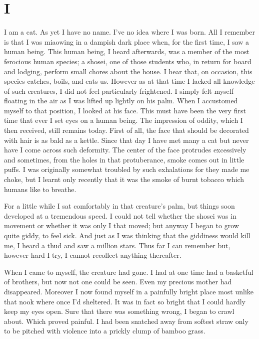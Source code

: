 \documentclass{book}
\begin{document}
\chapter*{\centering I}
I am a cat. As yet I have no name. I've no idea where I was born. All I
remember is that I was miaowing in a dampish dark place when, for the
first time, I saw a human being. This human being, I heard afterwards,
was a member of the most ferocious human species; a shosei, one of those
students who, in return for board and lodging, perform small chores
about the house. I hear that, on occasion, this species catches, boils,
and eats us. However as at that time I lacked all knowledge of such
creatures, I did not feel particularly frightened. I simply felt myself
floating in the air as I was lifted up lightly on his palm. When I
accustomed myself to that position, I looked at his face. This must have
been the very first time that ever I set eyes on a human being. The
impression of oddity, which I then received, still remains today. First
of all, the face that should be decorated with hair is as bald as a
kettle. Since that day I have met many a cat but never have I come
across such deformity. The center of the face protrudes excessively and
sometimes, from the holes in that protuberance, smoke comes out in
little puffs. I was originally somewhat troubled by such exhalations for
they made me choke, but I learnt only recently that it was the smoke of
burnt tobacco which humans like to breathe.

For a little while I sat comfortably in that creature's palm, but things
soon developed at a tremendous speed. I could not tell whether the
shosei was in movement or whether it was only I that moved; but anyway I
began to grow quite giddy, to feel sick. And just as I was thinking that
the giddiness would kill me, I heard a thud and saw a million stars.
Thus far I can remember but, however hard I try, I cannot recollect
anything thereafter.

When I came to myself, the creature had gone. I had at one time had a
basketful of brothers, but now not one could be seen. Even my precious
mother had disappeared. Moreover I now found myself in a painfully
bright place most unlike that nook where once I'd sheltered. It was in
fact so bright that I could hardly keep my eyes open. Sure that there
was something wrong, I began to crawl about. Which proved painful. I had
been snatched away from softest straw only to be pitched with violence
into a prickly clump of bamboo grass.
\end{document}
